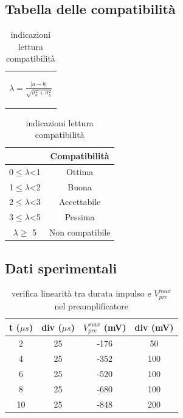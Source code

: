 \documentclass{article}
\begin{document}
\subsection{Tabella delle compatibilità}
\medskip
\begin{table}[H]
    \centering
    \begin{tabular}{c}
        \begin{Large}
        $\lambda=\frac{|a-b|}{\sqrt{\sigma_a^2+\sigma_b^2}}$
        \end{Large}\\
    \end{tabular}
    \hspace{0.5cm}
    \begin{tabular}{cc}
        \toprule
        &       \textbf{Compatibilità   }       \\
        \midrule
        0$\leq \lambda$<1   &Ottima                 \\
        1$\leq \lambda$<2   &Buona                  \\
        2$\leq \lambda$<3   &Accettabile            \\
        3$\leq\lambda$<5   &Pessima                \\
        $ \lambda \geq $  5     &Non compatibile        \\
        \bottomrule
    \end{tabular}
    \caption{indicazioni lettura compatibilità}
    \label{tab:compatibilità}
\end{table}

\subsection{Dati sperimentali}

\begin{table}[H]
    \centering
    \begin{tabular}{cccc}
        \toprule
        t ($\mu s$) & div ($\mu s$) & $V_{pre}^{max}$ (mV) & div (mV) \\
        \midrule
        2		&	25	&	-176	&	50	\\
        4		&	25	&	-352	&	100	\\
        6		&	25	&	-520	&	100	\\
        8		&	25	&	-680	&	100	\\
        10		&	25	&	-848	&	200	\\
        \bottomrule
    \end{tabular}
    \caption{verifica linearità tra durata impulso e $V_{pre}^{max}$ nel preamplificatore}
\end{table}
\end{document}
